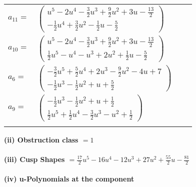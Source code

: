 \documentclass[1p]{elsarticle_modified}
\theoremstyle{definition}
\begin{document}
\begin{tabular}{m{7pt} m{180pt} m{7pt} m{180pt} }
\flushright $a_{11}=$&$\begin{pmatrix}u^5-2 u^4-\frac{3}{2} u^3+\frac{9}{2} u^2+3 u-\frac{13}{2}\\-\frac{1}{2} u^4+\frac{3}{2} u^2-\frac{1}{2} u-\frac{5}{2}\end{pmatrix}$ \\
\flushright $a_{10}=$&$\begin{pmatrix}u^5-2 u^4-\frac{3}{2} u^3+\frac{9}{2} u^2+3 u-\frac{13}{2}\\\frac{1}{2} u^5- u^4- u^3+2 u^2+\frac{1}{2} u-\frac{5}{2}\end{pmatrix}$ \\
\flushright $a_{6}=$&$\begin{pmatrix}-\frac{3}{2} u^5+\frac{5}{2} u^4+2 u^3-\frac{9}{2} u^2-4 u+7\\-\frac{1}{2} u^3-\frac{1}{2} u^2+u+\frac{5}{2}\end{pmatrix}$ \\
\flushright $a_{9}=$&$\begin{pmatrix}-\frac{1}{2} u^3-\frac{1}{2} u^2+u+\frac{1}{2}\\\frac{1}{2} u^5+\frac{1}{2} u^4-\frac{3}{2} u^3- u^2+\frac{1}{2}\end{pmatrix}$\\&\end{tabular}
\flushleft \textbf{(ii) Obstruction class $= 1$}\\~\\
\flushleft \textbf{(iii) Cusp Shapes $= \frac{17}{2} u^5-16 u^4-12 u^3+27 u^2+\frac{55}{2} u-\frac{81}{2}$}\\~\\
\newpage\renewcommand{\arraystretch}{1}
\flushleft \textbf{(iv) u-Polynomials at the component}\newline \\
\end{document}
